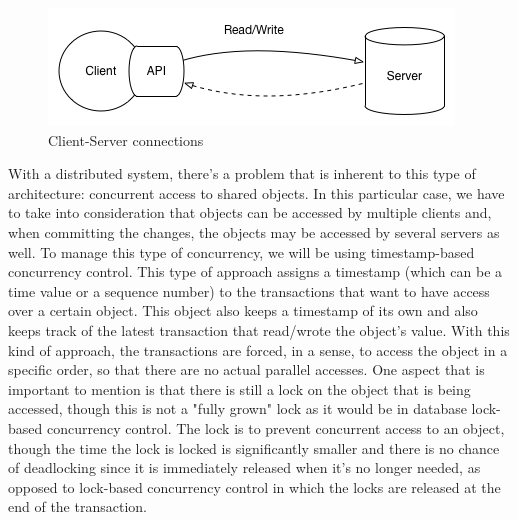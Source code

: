 \documentclass[times, 10pt,twocolumn]{article}
\begin{document}
\begin{figure}[h!]
	\centering
	\includegraphics[scale=0.45]{Client-Server.png}
	\caption{Client-Server connections}
\end{figure}


With a distributed system, there's a problem that is inherent to this type of architecture: concurrent access to shared objects. In this particular case, we have to take into consideration that objects can be accessed by multiple clients and, when committing the changes, the objects may be accessed by several servers as well.
To manage this type of concurrency, we will be using timestamp-based concurrency control. This type of approach assigns a timestamp (which can be a time value or a sequence number) to the transactions that want to have access over a certain object. This object also keeps a timestamp of its own and also keeps track of the latest transaction that read/wrote the object's value. With this kind of approach, the transactions are forced, in a sense, to access the object in a specific order, so that there are no actual parallel accesses.
One aspect that is important to mention is that there is still a lock on the object that is being accessed, though this is not a "fully grown" lock as it would be in database lock-based concurrency control. The lock is to prevent concurrent access to an object, though the time the lock is locked is significantly smaller and there is no chance of deadlocking since it is immediately released when it's no longer needed, as opposed to lock-based concurrency control in which the locks are released at the end of the transaction.

\end{document}
